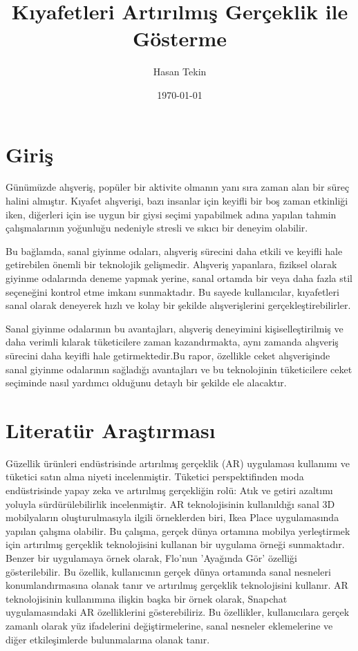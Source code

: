 \documentclass[12pt, a4paper]{article}
\title{Kıyafetleri Artırılmış Gerçeklik ile Gösterme}
\author{Hasan Tekin}
\date{\today}
\begin{document}
	\maketitle
    
    
    
    
	\section{Giriş}
	Günümüzde alışveriş, popüler bir aktivite olmanın yanı sıra zaman alan bir süreç halini almıştır. Kıyafet alışverişi, bazı insanlar için keyifli bir boş zaman etkinliği iken, diğerleri için ise uygun bir giysi seçimi yapabilmek adına yapılan tahmin çalışmalarının yoğunluğu nedeniyle stresli ve sıkıcı bir deneyim olabilir.
	
	Bu bağlamda, sanal giyinme odaları, alışveriş sürecini daha etkili ve keyifli hale getirebilen önemli bir teknolojik gelişmedir. Alışveriş yapanlara, fiziksel olarak giyinme odalarında deneme yapmak yerine, sanal ortamda bir veya daha fazla stil seçeneğini kontrol etme imkanı sunmaktadır. Bu sayede kullanıcılar, kıyafetleri sanal olarak deneyerek hızlı ve kolay bir şekilde alışverişlerini gerçekleştirebilirler.
	
	Sanal giyinme odalarının bu avantajları, alışveriş deneyimini kişiselleştirilmiş ve daha verimli kılarak tüketicilere zaman kazandırmakta, aynı zamanda alışveriş sürecini daha keyifli hale getirmektedir.Bu rapor, özellikle ceket alışverişinde sanal giyinme odalarının sağladığı avantajları ve bu teknolojinin tüketicilere ceket seçiminde nasıl yardımcı olduğunu detaylı bir şekilde ele alacaktır.
	
	
	\section{Literatür Araştırması}
	
	Güzellik ürünleri endüstrisinde artırılmış gerçeklik (AR) uygulaması kullanımı ve tüketici satın alma niyeti \cite{wang2022augmented} incelenmiştir.  
	Tüketici perspektifinden moda endüstrisinde yapay zeka ve artırılmış gerçekliğin rolü: Atık ve getiri azaltımı yoluyla sürdürülebilirlik  \cite{karadayi2024role} incelenmiştir. 
    AR teknolojisinin kullanıldığı sanal 3D mobilyaların oluşturulmasıyla ilgili örneklerden biri, Ikea Place \cite{ikea} uygulamasında yapılan çalışma olabilir. Bu çalışma, gerçek dünya ortamına mobilya yerleştirmek için artırılmış gerçeklik teknolojisini kullanan bir uygulama örneği sunmaktadır.
    Benzer bir uygulamaya örnek olarak, Flo'nun 'Ayağında Gör'\cite{flo} özelliği gösterilebilir. Bu özellik, kullanıcının gerçek dünya ortamında sanal nesneleri konumlandırmasına olanak tanır ve artırılmış gerçeklik teknolojisini kullanır.
    AR teknolojisinin kullanımına ilişkin başka bir örnek olarak, Snapchat uygulamasındaki \cite{snapchat} AR özelliklerini gösterebiliriz. Bu özellikler, kullanıcılara gerçek zamanlı olarak yüz ifadelerini değiştirmelerine, sanal nesneler eklemelerine ve diğer etkileşimlerde bulunmalarına olanak tanır.
    
\end{document}
